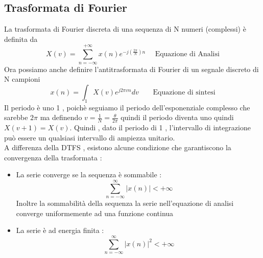 \documentclass{article}
\theoremstyle{definition}
\newcommand{\suminf}{\sum_{n=-\infty}^{\infty}}
\begin{document}
	\subsection{Trasformata di Fourier }
	La trasformata di Fourier discreta di una sequenza di N numeri (complessi) è definita da 
	$$X(v)=\sum_{n=-\infty}^{+\infty}x(n)e^{-j\left(\frac{2\pi}{N}\right) n } \ \ \ \ \ \ \text{Equazione di Analisi}$$
	Ora possiamo anche definire l'antitrasformata di Fourier di un segnale discreto di N campioni
	$$x(n)=\int_1 X(v)e^{j2\pi v n }dv \ \ \ \ \ \ \ \ \ \text{Equazione di sintesi}$$
	Il periodo è uno 1 , poichè seguiamo il periodo dell'esponenziale complesso che sarebbe $2\pi$ ma definendo $v=\frac{1}{N}=\frac{\theta}{2\pi }$ quindi il periodo diventa uno quindi $X(v+1)=X(v)$. Quindi , dato il periodo di 1 , l'intervallo di integrazione può essere un qualsiasi intervallo di ampiezza unitario.\\   
	A differenza della DTFS , esistono alcune condizione che garantiscono la convergenza della trasformata : 
	\begin{itemize}
		\item La serie converge se la sequenza è sommabile : 
		$$\suminf |x(n)| < +\infty $$
		Inoltre la sommabilità della sequenza la serie nell'equazione di analisi converge uniformemente ad una funzione continua 
		\item La serie è ad energia finita : 
		$$\suminf |x(n)|^2 < +\infty $$
			\end{itemize}
	
	
	
	
	
	
	
	
	
	
	
	
	
	
	\newpage
\end{document}

